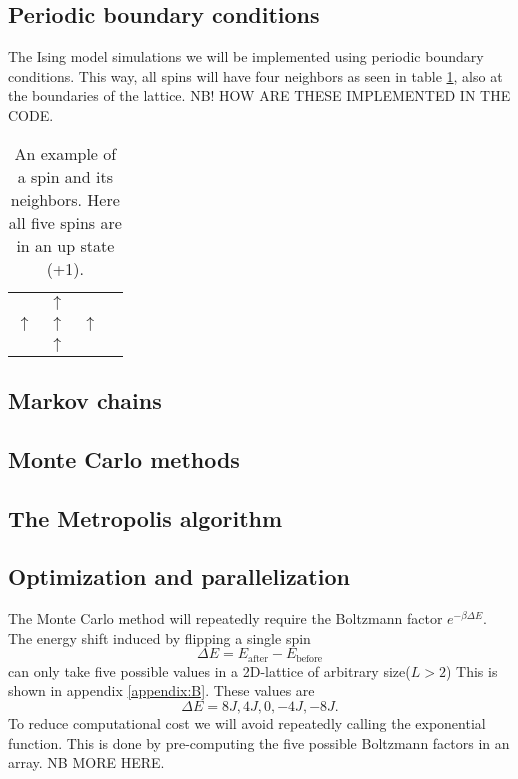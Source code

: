 \documentclass[english,notitlepage,reprint,nofootinbib]{revtex4-1}  %
\begin{document}
\subsection*{Periodic boundary conditions}
The Ising model simulations we will be implemented using periodic boundary conditions. This way, all spins will have four neighbors as seen in table \ref{tab:neighbors}, also at the boundaries of the lattice. NB! HOW ARE THESE IMPLEMENTED IN THE CODE.
\begin{table}[H]
    \centering
    \begin{tabular}{llll}
       & $\uparrow$ &    \\
    $\uparrow$ & $\uparrow$ & $\uparrow$ \\
       & $\uparrow$ & 
    \end{tabular}\label{tab:neighbors}
    \caption{An example of a spin and its neighbors. Here all five spins are in an up state (+1).} 
    \end{table}

\subsection*{Markov chains}

\subsection*{Monte Carlo methods}

\subsection*{The Metropolis algorithm}

\subsection*{Optimization and parallelization}

The Monte Carlo method will repeatedly require the Boltzmann factor $e^{-\beta \Delta E}$. The energy shift induced by flipping a single spin 
\begin{equation}
    \Delta E = E_{\text{after}} - E_{\text{before}}
\end{equation}
can only take five possible values in a 2D-lattice of arbitrary size($L > 2$) This is shown in appendix \ref{appendix:B}. These values are
\begin{equation}
    \Delta E = 8J, 4J, 0, -4J, -8J.
\end{equation}
To reduce computational cost we will avoid repeatedly calling the exponential function. This is done by pre-computing the five possible Boltzmann factors in an array. NB MORE HERE.
\end{document}
